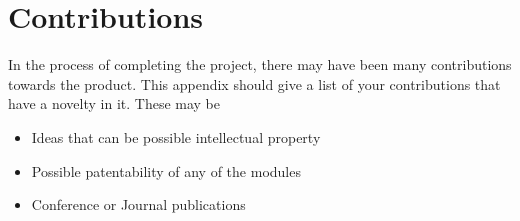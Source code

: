 
\chapter{Contributions}

In the process of completing the project, there may have been many
contributions towards the product. This appendix should give a list
of your contributions that have a novelty in it. These may be
\begin{itemize}
\item Ideas that can be possible intellectual property
\item Possible patentability of any of the modules
\item Conference or Journal publications\end{itemize}

